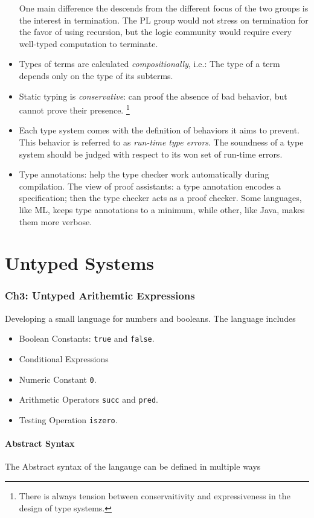 \documentclass[]{article}
\begin{document}
\begin{itemize}
\begin{itemize}
	\end{itemize}
One main difference the descends from the different focus of the two groups is the interest in termination. The PL group would not stress on termination for the favor of using recursion, but the logic community would require every well-typed computation to terminate. 
\item Types of terms are calculated \emph{compositionally}, i.e.: The type of a term depends only on the type of its subterms. 
\item Static typing is \emph{conservative}: can proof the absence of bad behavior, but cannot prove their presence. \footnote{There is always tension between conservaitivity and expressiveness in the design of type systems.}
\item Each type system comes with the definition of behaviors it aims to prevent. This behavior is referred to as \emph{run-time type errors}. The soundness of a type system should be judged with respect to its won set of run-time errors. 
\item Type annotations: help the type checker work automatically during compilation. The view of proof assistants: a type annotation encodes a specification; then the type checker acts as a proof checker. Some languages, like ML, keeps type annotations to a minimum, while other, like Java, makes them more verbose. 
\end{itemize}

\newpage

\part*{Untyped Systems}

\section{Ch3: Untyped Arithemtic Expressions}
Developing a small language for numbers and booleans. The language includes
\begin{itemize}
	\item Boolean Constants: \verb|true| and \verb|false|.
	\item Conditional Expressions 
	\item Numeric Constant \verb|0|.
	\item Arithmetic Operators \verb|succ| and \verb|pred|.
	\item Testing Operation \verb|iszero|.  
\end{itemize}
\subsection*{Abstract Syntax}
The Abstract syntax of the langauge can be defined in multiple ways 
\end{document}
